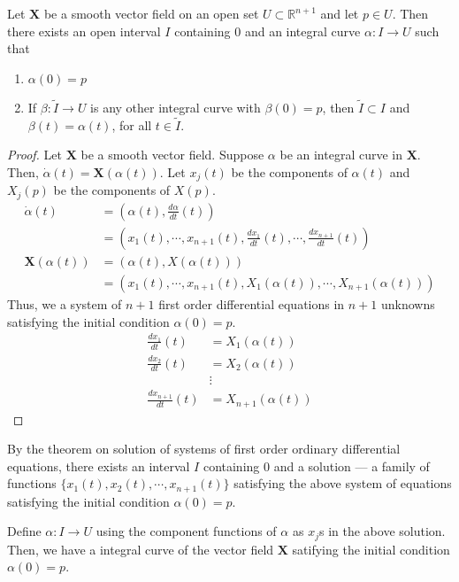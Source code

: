 \begin{theorem}
	Let $\mathbf{X}$ be a smooth vector field on an open set $U \subset \mathbb{R}^{n+1}$ and let $p \in U$.
	Then there exists an open interval $I$ containing $0$ and an integral curve $\alpha : I \to U$ such that
	\begin{enumerate}
		\item $\alpha(0) = p$
		\item If $\beta : \tilde{I} \to U$ is any other integral curve with $\beta(0) = p$, then $\tilde{I} \subset I$ and $\beta(t) = \alpha(t)$, for all $t \in \tilde{I}$.
	\end{enumerate}
\end{theorem}
\begin{proof}
	Let $\mathbf{X}$ be a smooth vector field.
	Suppose $\alpha$ be an integral curve in $\mathbf{X}$.
	Then, $\dot{\alpha}(t) = \mathbf{X}(\alpha(t))$.
	Let $x_j(t)$ be the components of $\alpha(t)$ and $X_j(p)$ be the components of $X(p)$.
	\begin{align*}
		\dot{\alpha}(t) & = \left(\alpha(t),\frac{d \alpha}{dt}(t)\right) \\
		& = \left(x_1(t),\cdots,x_{n+1}(t),\frac{dx_1}{dt}(t),\cdots,\frac{dx_{n+1}}{dt}(t)\right)\\
		\mathbf{X}(\alpha(t)) & = (\alpha(t),X(\alpha(t))) \\
		& = \left( x_1(t),\cdots,x_{n+1}(t),X_1(\alpha(t)),\cdots,X_{n+1}(\alpha(t))\right)
	\end{align*}
	Thus, we a system of $n+1$ first order differential equations in $n+1$ unknowns satisfying the initial condition $\alpha(0) = p$.
	\begin{align*}
		\frac{dx_1}{dt}(t) & = X_1(\alpha(t)) \\
		\frac{dx_2}{dt}(t) & = X_2(\alpha(t)) \\
		& \vdots \\
		\frac{dx_{n+1}}{dt}(t) & = X_{n+1}(\alpha(t))
	\end{align*}
\end{proof}
	By the theorem on solution of systems of first order ordinary differential equations, there exists an interval $I$ containing $0$ and a solution --- a family of functions $\{ x_1(t), x_2(t), \cdots,x_{n+1}(t)\}$ satisfying the above system of equations satisfying the initial condition $\alpha(0) = p$.

	Define $\alpha : I \to U$ using the component functions of $\alpha$ as $x_j$s in the above solution. Then, we have a integral curve of the vector field $\mathbf{X}$ satifying the initial condition $\alpha(0) = p$.

